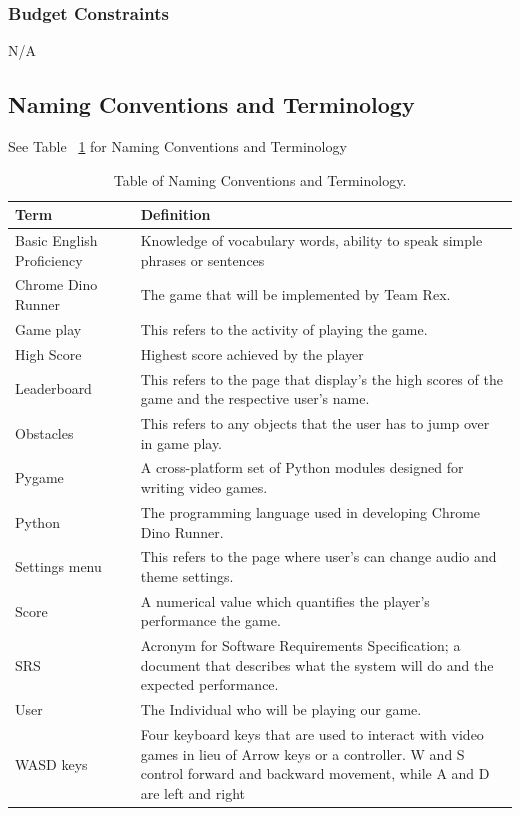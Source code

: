\documentclass[12pt]{article}
\begin{document}
\subsubsection{Budget Constraints}
N/A


\subsection{Naming Conventions and Terminology}
See Table ~\ref{table:naming} for Naming Conventions and Terminology
\begin{table}[] 
\centering
\caption{Table of Naming Conventions and Terminology.}
\begin{tabular}{l c p{}}
\toprule
Term       && Definition \\
\midrule
Basic English Proficiency && Knowledge of vocabulary words, ability to speak simple phrases or sentences \\
\midrule
Chrome Dino Runner  && The game that will be implemented by Team Rex. \\
\midrule
Game play && This refers to the activity of playing the game. \\
\midrule
High Score          && Highest score achieved by the player \\
\midrule

Leaderboard && This refers to the page that display's the high scores of the game and the respective user's name. \\
\midrule 
Obstacles && This refers to any objects that the user has to jump over in game play. \\
\midrule
Pygame              && A cross-platform set of Python modules designed for writing video games. \\
\midrule
Python              && The programming language used in developing Chrome Dino Runner. \\
\midrule

Settings menu && This refers to the page where user's can change audio and theme settings. \\
\midrule
Score               && A numerical value which quantifies the player's performance the game. \\
\midrule
SRS       && Acronym for Software Requirements Specification; a document that describes what the system will do and the expected performance. \\
\midrule
User       && The Individual who will be playing  our game. \\
\midrule
WASD keys           && Four keyboard keys that are used to interact with video games in lieu of Arrow keys or a controller. W and S control forward and backward movement, while A and D are left and right \\


\bottomrule
\end{tabular}
\label{table:naming}
\end{table}
\end{document}
